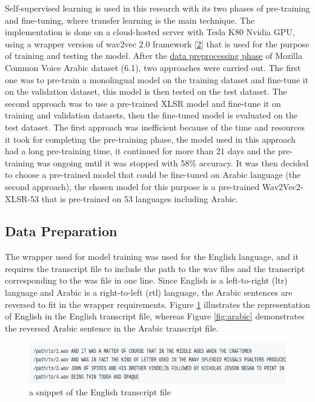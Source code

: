\documentclass[
  a4paper,
]{article}
\begin{document}
Self-supervised learning is used in this research with its two phases of
pre-training and fine-tuning, where transfer learning is the main
technique. The implementation is done on a cloud-hosted server with
Tesla K80 Nvidia GPU, using a wrapper version of wav2vec 2.0 framework
\protect\hyperlink{ref-2020arXiv200611477B}{{[}2{]}} that is used for
the purpose of training and testing the model. After the
\protect\hyperlink{data-preprocessing}{data preprocessing phase} of
Mozilla Common Voice Arabic dataset (6.1), two approaches were carried
out. The first one was to pre-train a monolingual model on the training
dataset and fine-tune it on the validation dataset, this model is then
tested on the test dataset. The second approach was to use a pre-trained
XLSR model and fine-tune it on training and validation datasets, then
the fine-tuned model is evaluated on the test dataset. The first
approach was inefficient because of the time and resources it took for
completing the pre-training phase, the model used in this approach had a
long pre-training time, it continued for more than 21 days and the
pre-training was ongoing until it was stopped with 58\% accuracy. It was
then decided to choose a pre-trained model that could be fine-tuned on
Arabic language (the second approach), the chosen model for this purpose
is a pre-trained Wav2Vec2-XLSR-53 that is pre-trained on 53 languages
including Arabic.

\hypertarget{data-preparation}{%
\subsection{Data Preparation}\label{data-preparation}}

The wrapper used for model training was used for the English language,
and it requires the transcript file to include the path to the wav files
and the transcript corresponding to the was file in one line. Since
English is a left-to-right (ltr) language and Arabic is a right-to-left
(rtl) language, the Arabic sentences are reversed to fit in the wrapper
requirements. Figure \ref{fig:english} illustrates the representation of
English in the English transcript file, whereas Figure \ref{fig:arabic}
demonstrates the reversed Arabic sentence in the Arabic transcript file.

\begin{figure}

{\centering \includegraphics{english} 

}

\caption{a snippet of the English transcript file}\label{fig:english}
\end{figure}
\end{document}
